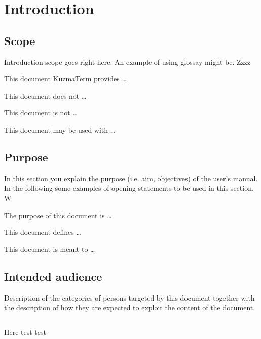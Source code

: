 \chapter{Introduction}
\label{chap:introduction}


\section{Scope}
Introduction scope goes right here. An example of using glossay might be. Zzzz 


This document \gls{KuzmaTerm}  provides \ldots


This document does not \ldots 
 
This document is not \ldots

 
This document may be used with \ldots




\section{Purpose}
In this section you explain the purpose (i.e. aim, objectives) of the user's
manual. In the following some examples of opening statements to be used in this
section. W  

The purpose of this document is \ldots

This document defines \ldots

This document is meant to \ldots



\section{Intended audience}
Description of the categories of persons targeted by this document together with the description of how they are expected to exploit the content of the document.


\section{\mysystemname}
Here test test

